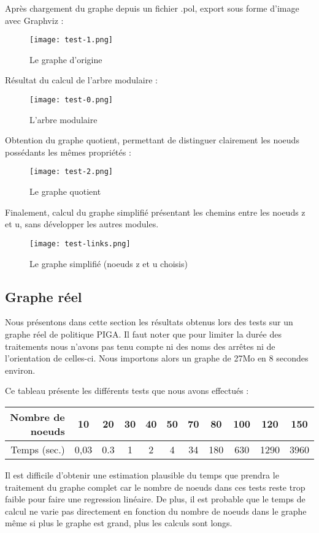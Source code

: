 \documentclass[pdftex,a4paper,titlepage,11pt,openright]{article}
\begin{document}
Après chargement du graphe depuis un fichier .pol, export sous forme d'image avec Graphviz :
\begin{figure}[!h]
	\begin{center}
	\texttt{[image: test-1.png]}
	\caption{Le graphe d'origine}
	\end{center}
\end{figure}

\newpage

Résultat du calcul de l'arbre modulaire :
\begin{figure}[!h]
	\begin{center}
	\texttt{[image: test-0.png]}
	\caption{L'arbre modulaire}
	\end{center}
\end{figure}

Obtention du graphe quotient, permettant de distinguer clairement les noeuds possédants les mêmes propriétés :
\begin{figure}[!h]
	\begin{center}
	\texttt{[image: test-2.png]}
	\caption{Le graphe quotient}
	\end{center}
\end{figure}

\newpage

Finalement, calcul du graphe simplifié présentant les chemins entre les noeuds z et u, sans développer les autres modules.
\begin{figure}[!h]
	\begin{center}
	\texttt{[image: test-links.png]}
	\caption{Le graphe simplifié (noeuds z et u choisis)}
	\end{center}
\end{figure}


\subsection{Graphe réel}
Nous présentons dans cette section les résultats obtenus lors des tests sur un graphe réel de politique PIGA. Il faut noter que pour limiter la durée des traitements nous n'avons pas tenu compte ni des noms des arrêtes ni de l'orientation de celles-ci. Nous importons alors un graphe de 27Mo en 8 secondes environ.

Ce tableau présente les différents tests que nous avons effectués :
\begin{center}
\begin{tabular}{|r|c|c|c|c|c|c|c|c|c|c|}
	\hline
	Nombre de noeuds & 10 & 20 & 30 & 40 & 50 & 70 & 80 & 100 & 120 & 150\\
	\hline
	Temps (sec.) & 0,03 & 0.3 & 1 & 2 & 4 & 34 & 180 & 630 & 1290 & 3960 \\
	\hline
\end{tabular}
\end{center}
Il est difficile d'obtenir une estimation plausible du temps que prendra le traitement du graphe complet car le nombre de noeuds dans ces tests reste trop faible pour faire une regression linéaire. De plus, il est probable que le temps de calcul ne varie pas directement en fonction du nombre de noeuds dans le graphe même si plus le graphe est grand, plus les calculs sont longs.
\end{document}
